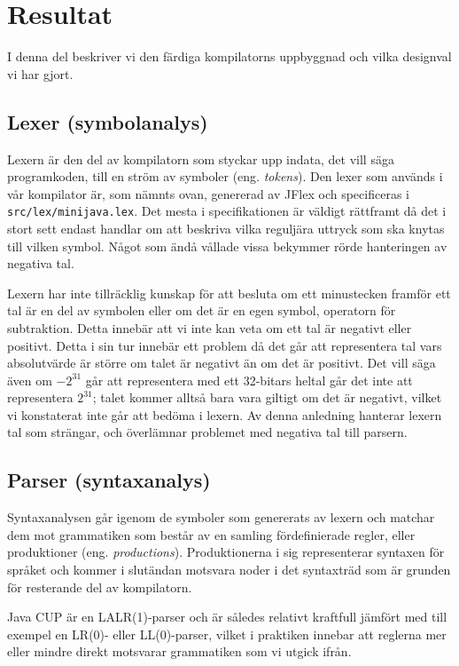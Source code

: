 \documentclass[a4paper,11pt]{article}
\newcommand{\trans}[2][eng.]{(#1 \emph{#2})}
\renewcommand{\*}[0]{\cdot}
\begin{document}
\section*{Resultat}

I denna del beskriver vi den färdiga kompilatorns uppbyggnad och vilka
designval vi har gjort.

\subsection*{Lexer (symbolanalys)}

Lexern är den del av kompilatorn som styckar upp indata, det vill säga
programkoden, till en ström av symboler \trans{tokens}. Den lexer som används i
vår kompilator är, som nämnts ovan, genererad av JFlex och specificeras i
\texttt{src/lex/minijava.lex}. Det mesta i specifikationen är väldigt rättframt
då det i stort sett endast handlar om att beskriva vilka reguljära uttryck som
ska knytas till vilken symbol. Något som ändå vållade vissa bekymmer rörde
hanteringen av negativa tal.

Lexern har inte tillräcklig kunskap för att besluta om ett minustecken framför
ett tal är en del av symbolen eller om det är en egen symbol, operatorn för
subtraktion. Detta innebär att vi inte kan veta om ett tal är negativt eller
positivt. Detta i sin tur innebär ett problem då det går att representera tal
vars absolutvärde är större om talet är negativt än om det är positivt. Det
vill säga även om $-2^{31}$ går att representera med ett 32-bitars heltal går
det inte att representera $2^{31}$; talet kommer alltså bara vara giltigt om
det är negativt, vilket vi konstaterat inte går att bedöma i lexern. Av denna
anledning hanterar lexern tal som strängar, och överlämnar problemet med
negativa tal till parsern.

\subsection*{Parser (syntaxanalys)}

Syntaxanalysen går igenom de symboler som genererats av lexern och matchar dem
mot grammatiken som består av en samling fördefinierade regler, eller
produktioner \trans{productions}. Produktionerna i sig representerar syntaxen
för språket och kommer i slutändan motsvara noder i det syntaxträd som är
grunden för resterande del av kompilatorn.

Java CUP är en LALR(1)-parser och är således relativt kraftfull jämfört med
till exempel en LR(0)- eller LL(0)-parser, vilket i praktiken innebar att
reglerna mer eller mindre direkt motsvarar grammatiken som vi utgick ifrån.
\end{document}
